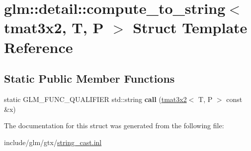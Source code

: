 \hypertarget{structglm_1_1detail_1_1compute__to__string_3_01tmat3x2_00_01T_00_01P_01_4}{}\section{glm\+:\+:detail\+:\+:compute\+\_\+to\+\_\+string$<$ tmat3x2, T, P $>$ Struct Template Reference}
\label{structglm_1_1detail_1_1compute__to__string_3_01tmat3x2_00_01T_00_01P_01_4}
\subsection*{Static Public Member Functions}
\begin{DoxyCompactItemize}
\item 
\mbox{\label{structglm_1_1detail_1_1compute__to__string_3_01tmat3x2_00_01T_00_01P_01_4_a08dc9495d864f76f2b163459d1d81de9}} 
static G\+L\+M\+\_\+\+F\+U\+N\+C\+\_\+\+Q\+U\+A\+L\+I\+F\+I\+ER std\+::string {\bfseries call} (\hyperlink{structglm_1_1tmat3x2}{tmat3x2}$<$ T, P $>$ const \&x)
\end{DoxyCompactItemize}


The documentation for this struct was generated from the following file\+:\begin{DoxyCompactItemize}
\item 
include/glm/gtx/\hyperlink{string__cast_8inl}{string\+\_\+cast.\+inl}\end{DoxyCompactItemize}
